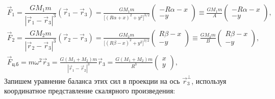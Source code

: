 \begin{gather*}
    \vec{F}_1
    = \dfrac{G M_1 m}{|\vec{r}_1 - \vec{r}_3 |^3} (\vec{r}_1 - \vec{r}_3)
    = \frac{G M_1 m}{\big[ (R \alpha + x)^2 + y^2 \big]^{3/2}}\begin{pmatrix}
        -R\alpha - x \\
        -y
    \end{pmatrix}
    \equiv \frac{G M_1 m}{A}\begin{pmatrix}
        -R\alpha - x \\
        -y
    \end{pmatrix},\\
    \vec{F}_2
        = \dfrac{G M_2 m}{|\vec{r}_2 - \vec{r}_3 |^3} (\vec{r}_2 - \vec{r}_3)
        = \frac{G M_2 m}{\big[ (R \beta - x)^2 + y^2 \big]^{3/2}}\begin{pmatrix}
            R\beta - x \\
            -y
        \end{pmatrix}
    \equiv \frac{G M_2 m}{B}\begin{pmatrix}
        R\beta - x \\
        -y
    \end{pmatrix},\\
    \vec{F}_\text{ц.б}
        = m\omega^2 \vec{r}_3
        = \frac{G (M_1 + M_2)m}{|\vec{r}_1 - \vec{r}_2|^3} \vec{r}_3
        = \frac{G(M_1 + M_2)m}{R^3} \begin{pmatrix}
            x \\
            y
        \end{pmatrix},
\end{gather*}
Запишем уравнение баланса этих сил в проекции на ось $\vec{r}_3^\perp$, используя координатное представление скалярного произведения:
